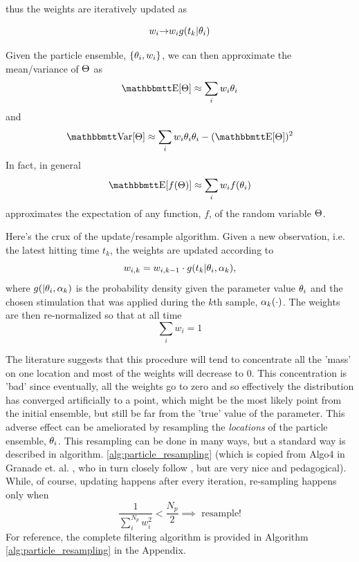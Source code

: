 \documentclass{article}
\begin{document}
thus the weights are iteratively updated as 

$$w_i {\rightarrow} w_i g(t_k|{\theta}_i)$$

Given the particle ensemble, $\{{\theta}_i, w_i\}$, we can  then approximate the
mean/variance of ${\Theta}$ as
$$ \Exp[\Th] \approx \sum_i w_i \th_i$$
and 
$$ \Var[\Th] \approx \sum_i w_i \th_i \th_i - (\Exp[\Th])^2$$
In fact, in general 
$$\Exp[f(\Th)]\approx\sum_i w_i f(\th_i)$$ approximates the expectation of any
function, $f$, of the random variable ${\Theta}$.

Here's the crux of the update/resample algorithm. Given a new observation, i.e.
the latest hitting time $t_k$, the weights are updated according to
$$ w_{i,k} = w_{i,k-1}\cdot g(t_k| {\theta}_i, {\alpha}_k),$$where $g(|{\theta}_i, {\alpha}_k)$ is
the probability density given the parameter value ${\theta}_i$ and the chosen
stimulation that was applied during the $k$th sample, ${\alpha}_k(\cdot)$.
The weights are then re-normalized so that at all time $$\sum_i w_i = 1$$ 

The literature suggests that this procedure will tend to concentrate all the
'mass' on one location and most of the weights will decrease to 0. This
concentration is 'bad' since eventually, all the weights go to zero and so
effectively the distribution has converged  artificially to a point, which might
be the most likely point from the initial ensemble, but still be far from the
'true' value of the parameter. This adverse effect can be ameliorated by
resampling the {\sl locations} of the particle ensemble, ${\theta}_i$. This
resampling can be done in many ways, but a standard way is described in
algorithm. \ref{alg:particle_resampling} (which is copied from Algo4 in Granade
et. al. \cite{Granade2012}, who in turn closely follow \cite{Liu2001}, but
are very nice and pedagogical).
While, of course, updating happens after every iteration, re-sampling happens
only when  
$$ \frac{1}{\sum_i^{N_p} w_i^2} < \frac {N_p}{2} \implies \textrm{ resample!}$$
For reference, the complete filtering algorithm is provided in 
Algorithm \ref{alg:particle_resampling} in the Appendix.
\end{document}
